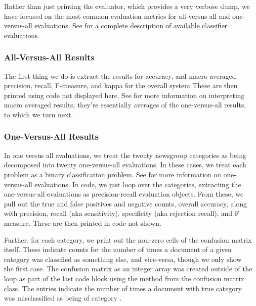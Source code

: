 Rather than just printing the evaluator, which provides a very verbose
dump, we have focused on the most common evaluation metrics for
all-versus-all and one-versus-all evaluations.  See
 for a complete description of
available classifier evaluations.

\subsubsection{All-Versus-All Results}

The first thing we do is extract the results for accuracy,
and macro-averaged precision, recall, F-measure, and kappa
for the overall system
%
%
These are then printed using code not displayed here.  See
 for more information on
interpreting macro averaged results; they're essentially averages
of the one-versus-all results, to which we turn next.


\subsubsection{One-Versus-All Results}

In one versus all evaluations, we treat the twenty newsgroup
categories as being decomposed into twenty one-versus-all evaluations.
In these cases, we treat each problem as a binary classification problem.
See  for more information on
one-versus-all evaluations.  In code, we just loop over the
categories, extracting the one-versus-all evaluations as
precision-recall evaluation objects.
%
%
From these, we pull out the true and false positives and negative
counts, overall accuracy, along with precision, recall (aka sensitivity),
specificity (aka rejection recall), and F measure.  These are then
printed in code not shown.

Further, for each category, we print out the non-zero cells of
the confusion matrix itself.  These indicate counts for the
number of times a document of a given category was classified
as something else, and vice-versa, though we only show the first
case.
%
%
The confusion matrix as an integer array was created outside of the
loop as part of the last code block using the  method
from the confusion matrix class.  The entries 
indicate the number of times a document with true category 
was misclassified as being of category .

